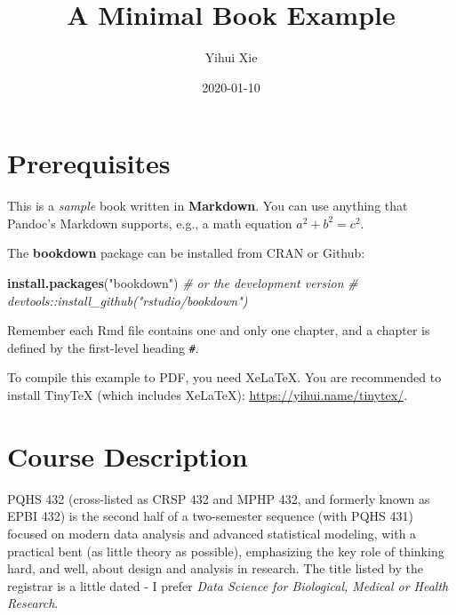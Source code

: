 \documentclass[
]{book}
\title{A Minimal Book Example}
\author{Yihui Xie}
\date{2020-01-10}
\newenvironment{Shaded}{\begin{snugshade}}{\end{snugshade}}
\newcommand{\CommentTok}[1]{\textcolor[rgb]{0.56,0.35,0.01}{\textit{#1}}}
\newcommand{\KeywordTok}[1]{\textcolor[rgb]{0.13,0.29,0.53}{\textbf{#1}}}
\newcommand{\NormalTok}[1]{#1}
\newcommand{\StringTok}[1]{\textcolor[rgb]{0.31,0.60,0.02}{#1}}
\begin{document}
\frontmatter
\maketitle

{
\setcounter{tocdepth}{1}
\tableofcontents
}
\mainmatter
\hypertarget{prerequisites}{%
\chapter{Prerequisites}\label{prerequisites}}

This is a \emph{sample} book written in \textbf{Markdown}. You can use anything that Pandoc's Markdown supports, e.g., a math equation \(a^2 + b^2 = c^2\).

The \textbf{bookdown} package can be installed from CRAN or Github:

\begin{Shaded}
\begin{Highlighting}[]
\KeywordTok{install.packages}\NormalTok{(}\StringTok{"bookdown"}\NormalTok{)}
\CommentTok{# or the development version}
\CommentTok{# devtools::install_github("rstudio/bookdown")}
\end{Highlighting}
\end{Shaded}

Remember each Rmd file contains one and only one chapter, and a chapter is defined by the first-level heading \texttt{\#}.

To compile this example to PDF, you need XeLaTeX. You are recommended to install TinyTeX (which includes XeLaTeX): \url{https://yihui.name/tinytex/}.

\hypertarget{course-description}{%
\chapter{Course Description}\label{course-description}}

PQHS 432 (cross-listed as CRSP 432 and MPHP 432, and formerly known as EPBI 432) is the second half of a two-semester sequence (with PQHS 431) focused on modern data analysis and advanced statistical modeling, with a practical bent (as little theory as possible), emphasizing the key role of thinking hard, and well, about design and analysis in research. The title listed by the registrar is a little dated - I prefer \emph{Data Science for Biological, Medical or Health Research}.
\end{document}

